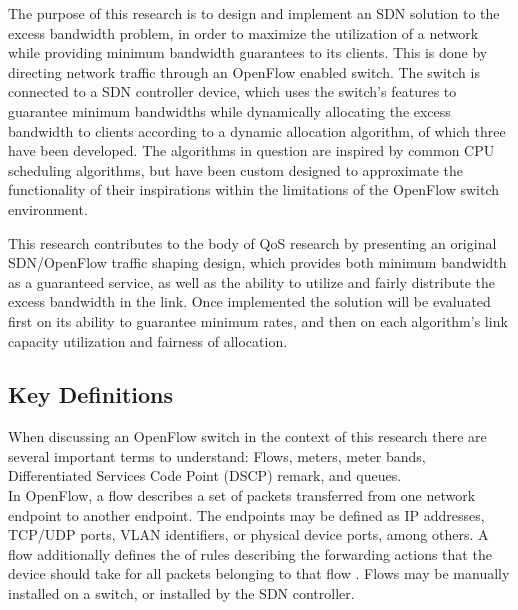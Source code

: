 \documentclass[accepted,single]{gipaper}
\begin{document}
The purpose of this research is to design and implement an SDN solution to the excess bandwidth problem, in order to maximize the utilization of a network while providing minimum bandwidth guarantees to its clients. This is done by directing network traffic through an OpenFlow enabled switch. The switch is connected to a SDN controller device, which uses the switch's features to guarantee minimum bandwidths while dynamically allocating the excess bandwidth to clients according to a dynamic allocation algorithm, of which three have been developed. The algorithms in question are inspired by common CPU scheduling algorithms, but have been custom designed to approximate the functionality of their inspirations within the limitations of the OpenFlow switch environment.

This research contributes to the body of QoS research by presenting an original SDN/OpenFlow traffic shaping design, which provides both minimum bandwidth as a guaranteed service, as well as the ability to utilize and fairly distribute the excess bandwidth in the link. Once implemented the solution will be evaluated first on its ability to guarantee minimum rates, and then on each algorithm's link capacity utilization and fairness of allocation.


\subsection{Key Definitions}
\label{definitions}

When discussing an OpenFlow switch in the context of this research there are several important terms to understand: Flows, meters, meter bands, Differentiated Services Code Point (DSCP) remark, and queues.
\\

In OpenFlow, a flow describes a set of packets transferred from one network endpoint to another endpoint. The endpoints may be defined as IP addresses, TCP/UDP ports, VLAN identifiers, or physical device ports, among others. A flow additionally defines the of rules describing the forwarding actions that the device should take for all packets belonging to that flow \cite{flowdef}. Flows may be manually installed on a switch, or installed by the SDN controller.
\end{document}
